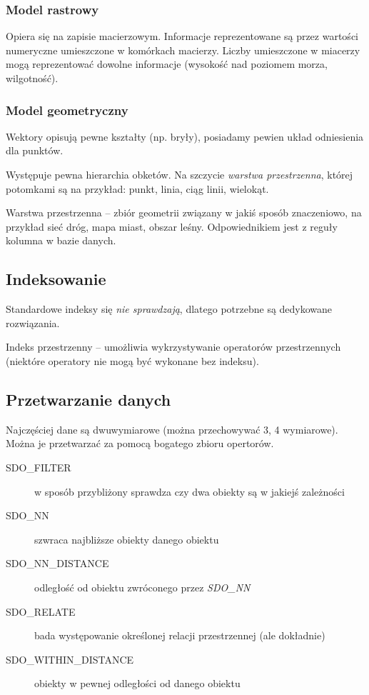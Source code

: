 \documentclass[12pt]{article}
\begin{document}
\subsubsection{Model rastrowy}
Opiera się na zapisie macierzowym. Informacje reprezentowane są przez wartości
numeryczne umieszczone w komórkach macierzy. Liczby umieszczone w miacerzy mogą
reprezentować dowolne informacje (wysokość nad poziomem morza, wilgotność).


\subsubsection{Model geometryczny}
Wektory opisują pewne kształty (np. bryły), posiadamy pewien układ odniesienia
dla punktów.

Występuje pewna hierarchia obketów. Na szczycie \emph{warstwa przestrzenna},
której potomkami są na przykład: punkt, linia, ciąg linii, wielokąt.

Warstwa przestrzenna -- zbiór geometrii związany w jakiś sposób znaczeniowo, na
przykład sieć dróg, mapa miast, obszar leśny. Odpowiednikiem jest z reguły
kolumna w bazie danych.

\subsection{Indeksowanie}
Standardowe indeksy się \emph{nie sprawdzają}, dlatego potrzebne są dedykowane
rozwiązania.

Indeks przestrzenny -- umożliwia wykrzystywanie operatorów przestrzennych (niektóre
operatory nie mogą być wykonane bez indeksu).

\subsection{Przetwarzanie danych}
Najczęściej dane są dwuwymiarowe (można przechowywać 3, 4 wymiarowe). Można je przetwarzać
za pomocą bogatego zbioru opertorów.

\begin{description}
\item[SDO\_FILTER] w sposób przybliżony sprawdza czy dwa obiekty są w jakiejś zależności
\item[SDO\_NN] szwraca najbliższe obiekty danego obiektu
\item[SDO\_NN\_DISTANCE] odległość od obiektu zwróconego przez \emph{SDO\_NN}
\item[SDO\_RELATE] bada występowanie określonej relacji przestrzennej (ale dokładnie)
\item[SDO\_WITHIN\_DISTANCE] obiekty w pewnej odległości od danego obiektu
\end{description}
\end{document}
